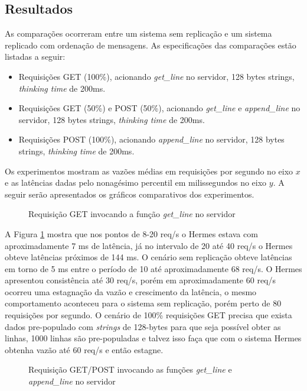 \subsection{Resultados}

As comparações ocorreram entre um sistema sem replicação e um sistema replicado com ordenação de mensagens. As especificações das comparações estão listadas a seguir:

\begin{itemize}
\item Requisições GET (100\%), acionando \textit{get\_line} no servidor, 128 bytes strings, \textit{thinking time} de 200ms.
\item Requisições GET (50\%) e POST (50\%), acionando \textit{get\_line} e \textit{append\_line} no servidor, 128 bytes strings, \textit{thinking time} de 200ms.
\item Requisições POST (100\%), acionando \textit{append\_line} no servidor, 128 bytes strings, \textit{thinking time} de 200ms.
\end{itemize}

Os experimentos mostram as vazões médias em requisições por segundo no eixo $x$ e as latências dadas pelo nonagésimo percentil em milissegundos no eixo $y$. A seguir serão apresentados os gráficos comparativos dos experimentos.

\begin{figure}[htb!]
\centering
\caption{Requisição GET invocando a função \textit{get\_line} no servidor}

\label{fig:get-line}
\end{figure}

A Figura \ref{fig:get-line} mostra que nos pontos de 8-20 req/s o Hermes estava com aproximadamente 7 ms de latência, já no intervalo de 20 até 40 req/s o Hermes obteve latências próximos de 144 ms. O cenário sem replicação obteve latências em torno de 5 ms entre o período de 10 até aproximadamente 68 req/s. O Hermes apresentou consistência até 30 req/s, porém em aproximadamente 60 req/s ocorreu uma estagnação da vazão e crescimento da latência, o mesmo comportamento aconteceu para o sistema sem replicação, porém perto de 80 requisições por segundo. O cenário de 100\% requisições GET precisa que exista dados pre-populado com \textit{strings} de 128-bytes para que seja possível obter as linhas, 1000 linhas são pre-populadas e talvez isso faça que com o sistema Hermes obtenha vazão até 60 req/s e então estagne.

\begin{figure}[htb!]
\centering
\caption{Requisição GET/POST invocando as funções \textit{get\_line} e \textit{append\_line} no servidor}

\label{fig:get-append-line}
\end{figure}

